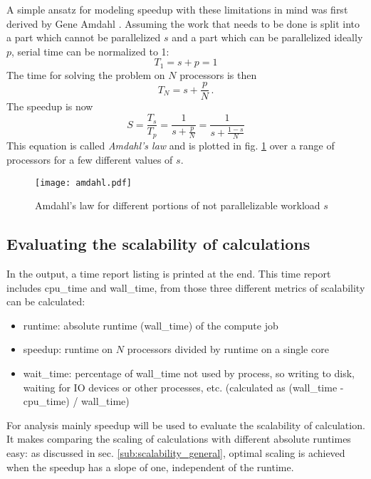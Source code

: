 \documentclass[main.tex]{subfiles}
\begin{document}
A simple ansatz for modeling speedup with these limitations in mind was first derived by Gene Amdahl \cite{amdahl_validity_1967}.
Assuming the work that needs to be done is split into a part which cannot be parallelized \(s\) and a part which can be parallelized ideally \(p\), serial time can be normalized to 1:
\begin{equation}
    T_1 = s + p = 1
\end{equation}
The time for solving the problem on \(N\) processors is then
\begin{equation}
    T_N = s + \frac{p}{N}\,.
\end{equation}
The speedup is now
\begin{equation}\label{eq:amdahls_law}
    S = \frac{T_s}{T_p} = \frac{1}{s + \frac{p}{N}} = \frac{1}{s + \frac{1 - s}{N}}
\end{equation}
This equation is called \emph{Amdahl's law} and is plotted in fig. \ref{fig:amdahl} over a range of processors for a few different values of \(s\).

\begin{figure}[ht!]
    \centering
    \texttt{[image: amdahl.pdf]}
    \label{fig:amdahl}
    \caption{Amdahl's law for different portions of not parallelizable workload \(s\)}
\end{figure}

\subsection{Evaluating the scalability of \QE calculations}\label{sub:scalability_qe}

In the \QE output, a time report listing is printed at the end.
This time report includes \gls{cpu_time} and \gls{wall_time}, from those three different metrics of scalability can be calculated:
\begin{itemize}
    \item runtime: absolute runtime (\gls{wall_time}) of the compute job
    \item speedup: runtime on \(N\) processors divided by runtime on a single core
    \item \gls{wait_time}: percentage of \gls{wall_time} not used by \QE process, so writing to disk, waiting for IO devices or other processes, etc. (calculated as (\gls{wall_time} - \gls{cpu_time}) / \gls{wall_time})
\end{itemize}
For analysis mainly speedup will be used to evaluate the scalability of \QE calculation.
It makes comparing the scaling of calculations with different absolute runtimes easy: as discussed in sec. \ref{sub:scalability_general}, optimal scaling is achieved when the speedup has a slope of one, independent of the runtime.
\end{document}
